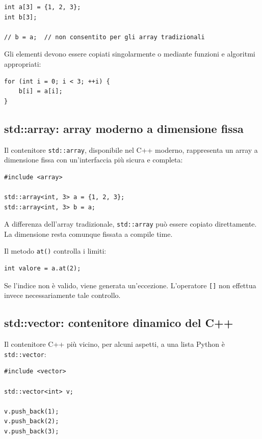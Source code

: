 \documentclass[11pt,a4paper]{book}
\begin{document}
\begin{lstlisting}[style=c++]
int a[3] = {1, 2, 3};
int b[3];

// b = a;  // non consentito per gli array tradizionali
\end{lstlisting}

Gli elementi devono essere copiati singolarmente o mediante funzioni e algoritmi appropriati:

\begin{lstlisting}[style=c++]
for (int i = 0; i < 3; ++i) {
    b[i] = a[i];
}
\end{lstlisting}

\subsection{std::array: array moderno a dimensione fissa}

Il contenitore \texttt{std::array}, disponibile nel C++ moderno, rappresenta un array a dimensione fissa con un'interfaccia più sicura e completa:

\begin{lstlisting}[style=c++]
#include <array>

std::array<int, 3> a = {1, 2, 3};
std::array<int, 3> b = a;
\end{lstlisting}

A differenza dell'array tradizionale, \texttt{std::array} può essere copiato direttamente. La dimensione resta comunque fissata a compile time.

Il metodo \texttt{at()} controlla i limiti:

\begin{lstlisting}[style=c++]
int valore = a.at(2);
\end{lstlisting}

Se l'indice non è valido, viene generata un'eccezione. L'operatore \texttt{[]} non effettua invece necessariamente tale controllo.

\subsection{std::vector: contenitore dinamico del C++}

Il contenitore C++ più vicino, per alcuni aspetti, a una lista Python è \texttt{std::vector}:

\begin{lstlisting}[style=c++]
#include <vector>

std::vector<int> v;

v.push_back(1);
v.push_back(2);
v.push_back(3);
\end{lstlisting}
\end{document}
